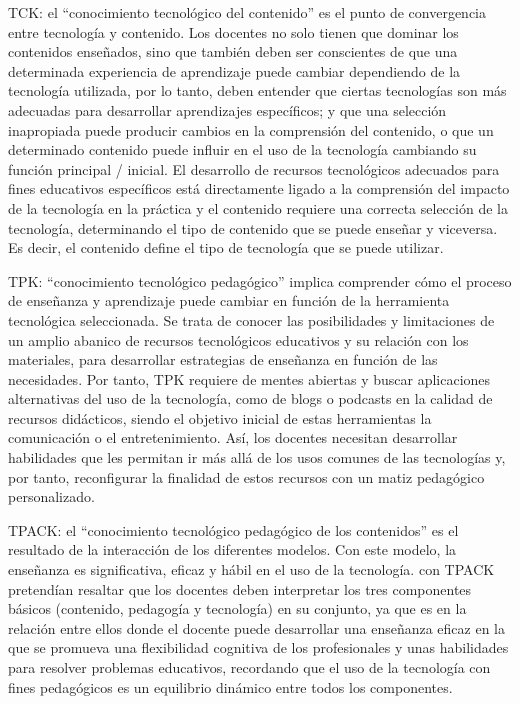 \documentclass[spanish]{textolivre}
\begin{document}
TCK: el “conocimiento tecnológico del contenido” es el punto de convergencia entre tecnología y contenido. Los docentes no solo tienen que dominar los contenidos enseñados, sino que también deben ser conscientes de que una determinada experiencia de aprendizaje puede cambiar dependiendo de la tecnología utilizada, por lo tanto, deben entender que ciertas tecnologías son más adecuadas para desarrollar aprendizajes específicos; y que una selección inapropiada puede producir cambios en la comprensión del contenido, o que un determinado contenido puede influir en el uso de la tecnología cambiando su función principal / inicial. El desarrollo de recursos tecnológicos adecuados para fines educativos específicos está directamente ligado a la comprensión del impacto de la tecnología en la práctica y el contenido requiere una correcta selección de la tecnología, determinando el tipo de contenido que se puede enseñar y viceversa. Es decir, el contenido define el tipo de tecnología que se puede utilizar.

TPK: “conocimiento tecnológico pedagógico” implica comprender cómo el proceso de enseñanza y aprendizaje puede cambiar en función de la herramienta tecnológica seleccionada. Se trata de conocer las posibilidades y limitaciones de un amplio abanico de recursos tecnológicos educativos y su relación con los materiales, para desarrollar estrategias de enseñanza en función de las necesidades. Por tanto, TPK requiere de mentes abiertas y buscar aplicaciones alternativas del uso de la tecnología, como de blogs o podcasts en la calidad de recursos didácticos, siendo el objetivo inicial de estas herramientas la comunicación o el entretenimiento. Así, los docentes necesitan desarrollar habilidades que les permitan ir más allá de los usos comunes de las tecnologías y, por tanto, reconfigurar la finalidad de estos recursos con un matiz pedagógico personalizado.

TPACK: el “conocimiento tecnológico pedagógico de los contenidos” es el resultado de la interacción de los diferentes modelos. Con este modelo, la enseñanza es significativa, eficaz y hábil en el uso de la tecnología. \textcite{koehler_what_2009} con TPACK pretendían resaltar que los docentes deben interpretar los tres componentes básicos (contenido, pedagogía y tecnología) en su conjunto, ya que es en la relación entre ellos donde el docente puede desarrollar una enseñanza eficaz en la que se promueva una flexibilidad  cognitiva de los profesionales y unas habilidades para resolver problemas educativos, recordando que el uso de la tecnología con fines pedagógicos es un equilibrio dinámico entre todos los componentes.
\end{document}
